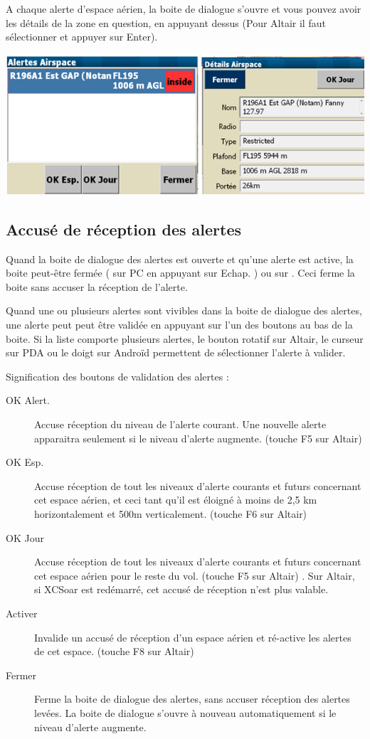 A chaque alerte d'espace aérien, la boite de dialogue s'ouvre et vous pouvez avoir les détails de la zone en question, en appuyant dessus (Pour Altair il faut sélectionner et appuyer sur Enter).
\begin{center}
\includegraphics[angle=0,width=\linewidth,keepaspectratio='true']{figures/alerteespaceaerien2.png}
\end{center}


\subsection*{Accusé de réception des alertes}

Quand la boite de dialogue des alertes est ouverte et qu'une alerte est active, la boite peut-être fermée ( sur PC en appuyant sur Echap. ) ou sur  . Ceci ferme la boite sans accuser la réception de l'alerte.

Quand une ou plusieurs alertes sont vivibles dans la boite de dialogue des alertes, une alerte peut peut être validée en appuyant sur l'un des boutons au bas de la boite. Si la liste comporte plusieurs alertes, le bouton rotatif sur Altair, le curseur sur PDA ou le doigt sur Androïd permettent de sélectionner l'alerte à valider.

Signification des boutons de validation  des alertes :
\begin{description}
\item[OK Alert.]  Accuse réception du niveau de l'alerte courant. Une nouvelle alerte apparaitra seulement si le niveau d'alerte augmente. (touche F5 sur Altair) 
\item[OK Esp.]  Accuse réception de tout les niveaux d'alerte courants et futurs concernant cet espace aérien, et ceci tant qu'il est éloigné à moins de 2,5 km horizontalement et 500m verticalement. (touche F6 sur Altair)  
\item[OK Jour]  Accuse réception de tout les niveaux d'alerte courants et futurs concernant cet espace aérien pour le reste du vol. (touche F5 sur Altair) . Sur Altair, si XCSoar est redémarré, cet accusé de réception n'est plus valable.
\item[Activer]  Invalide un accusé de réception d'un espace aérien et ré-active les alertes de cet espace. (touche F8 sur Altair) 
\item[Fermer] Ferme la boite de dialogue des alertes, sans accuser réception des alertes levées. La boite de dialogue s'ouvre à nouveau automatiquement si le niveau d'alerte augmente.
\end{description}

